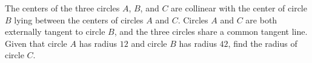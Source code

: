 The centers of the three circles $A$, $B$, and $C$ are collinear with the center of circle $B$ lying between the centers of circles $A$ and $C$. Circles $A$ and $C$ are both externally tangent to circle $B$, and the three circles share a common tangent line. Given that circle $A$ has radius $12$ and circle $B$ has radius $42$, find the radius of circle $C$. 
